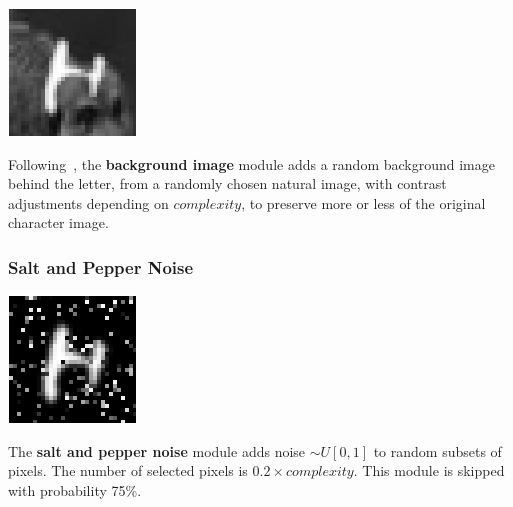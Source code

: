 \documentclass{article} %
\begin{document}
\begin{minipage}[t]{\linewidth}
\begin{minipage}[t]{0.14\linewidth}
\centering
\vspace*{0mm}
\includegraphics[scale=.4]{images/background_other_only.png}
\end{minipage}%
\hspace{0.3cm}\begin{minipage}[t]{0.83\linewidth}
\vspace*{1mm}
Following~\citet{Larochelle-jmlr-2009}, the {\bf background image} module adds a random
background image behind the letter, from a randomly chosen natural image,
with contrast adjustments depending on $complexity$, to preserve
more or less of the original character image.
\end{minipage}
\end{minipage}

\subsubsection*{Salt and Pepper Noise}

\begin{minipage}[t]{0.14\linewidth}
\centering
\vspace*{0mm}
\includegraphics[scale=.4]{images/Poivresel_only.png}
\end{minipage}%
\hspace{0.3cm}\begin{minipage}[t]{0.83\linewidth}
\vspace*{1mm}
The {\bf salt and pepper noise} module adds noise $\sim U[0,1]$ to random subsets of pixels.
The number of selected pixels is $0.2 \times complexity$.
This module is skipped with probability 75\%.
\end{minipage}
\end{document}
